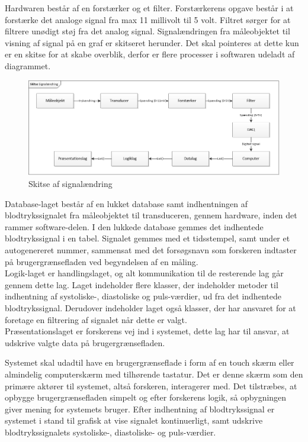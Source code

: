 Hardwaren består af en forstærker og et filter. Forstærkerens opgave består i at forstærke det analoge signal fra max 11 millivolt til 5 volt. Filtret sørger for at filtrere unødigt støj fra det analog signal. Signalændringen fra måleobjektet til visning af signal på en graf er skitseret herunder. Det skal pointeres at dette kun er en skitse for at skabe overblik, derfor er flere processer i softwaren udeladt af diagrammet. 
\begin{figure}[htb]
	\centering
	\includegraphics[width=1.0\textwidth]{Figurer/Signalandring}
	\caption{Skitse af signalændring}
\end{figure}
Database-laget består af en lukket database samt indhentningen af blodtrykssignalet fra måleobjektet til transduceren, gennem hardware, inden det rammer software-delen. I den lukkede database gemmes det indhentede blodtrykssignal i en tabel. Signalet gemmes med et tidsstempel, samt under et autogenereret nummer, sammensat med det forsøgsnavn som forskeren indtaster på brugergrænsefladen ved begyndelsen af en måling. \\
Logik-laget er handlingslaget, og alt kommunikation til de resterende lag går gennem dette lag. Laget indeholder flere klasser, der indeholder metoder til indhentning af systoliske-, diastoliske og puls-værdier, ud fra det indhentede blodtrykssignal. Derudover indeholder laget også klasser, der har ansvaret for at foretage en filtrering af signalet når dette er valgt. \\ 
Præsentationslaget er forskerens vej ind i systemet, dette lag har til ansvar, at udskrive valgte data på brugergrænsefladen. 

Systemet skal udadtil have en brugergrænseflade i form af en touch skærm eller almindelig computerskærm med tilhørende tastatur. Det er denne skærm som den primære aktører til systemet, altså forskeren, interagerer med. Det tilstræbes, at opbygge brugergrænsefladen simpelt og efter forskerens logik, så opbygningen giver mening for systemets bruger. Efter indhentning af blodtrykssignal er systemet i stand til grafisk at vise signalet kontinuerligt, samt udskrive blodtrykssignalets systoliske-, diastoliske- og puls-værdier. 
